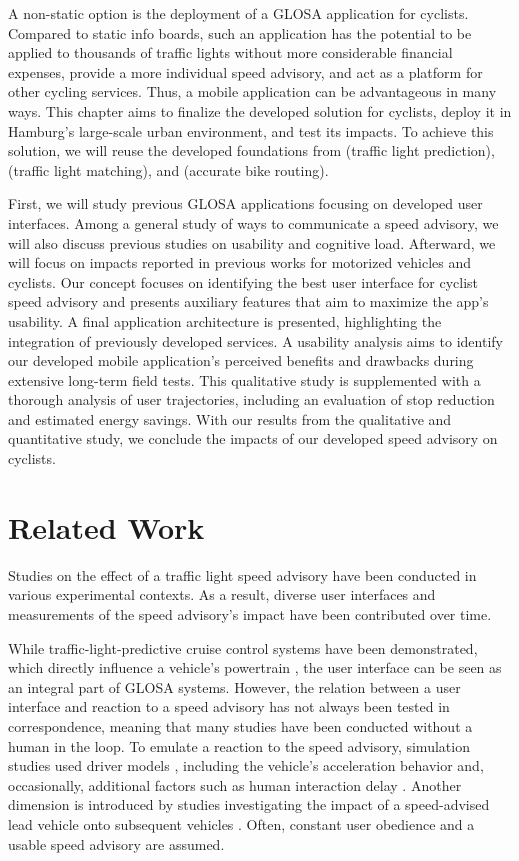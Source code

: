 A non-static option is the deployment of a GLOSA application for cyclists. Compared to static info boards, such an application has the potential to be applied to thousands of traffic lights without more considerable financial expenses, provide a more individual speed advisory, and act as a platform for other cycling services. Thus, a mobile application can be advantageous in many ways. This chapter aims to finalize the developed solution for cyclists, deploy it in Hamburg's large-scale urban environment, and test its impacts. To achieve this solution, we will reuse the developed foundations from  (traffic light prediction),  (traffic light matching), and  (accurate bike routing).

First, we will study previous GLOSA applications focusing on developed user interfaces. Among a general study of ways to communicate a speed advisory, we will also discuss previous studies on usability and cognitive load. Afterward, we will focus on impacts reported in previous works for motorized vehicles and cyclists. Our concept focuses on identifying the best user interface for cyclist speed advisory and presents auxiliary features that aim to maximize the app's usability. A final application architecture is presented, highlighting the integration of previously developed services. A usability analysis aims to identify our developed mobile application's perceived benefits and drawbacks during extensive long-term field tests. This qualitative study is supplemented with a thorough analysis of user trajectories, including an evaluation of stop reduction and estimated energy savings. With our results from the qualitative and quantitative study, we conclude the impacts of our developed speed advisory on cyclists. 

\section{Related Work}

Studies on the effect of a traffic light speed advisory have been conducted in various experimental contexts. As a result, diverse user interfaces and measurements of the speed advisory's impact have been contributed over time. 

While traffic-light-predictive cruise control systems have been demonstrated, which directly influence a vehicle's powertrain \cite{raubitschek_predictive_2011}, the user interface can be seen as an integral part of GLOSA systems. However, the relation between a user interface and reaction to a speed advisory has not always been tested in correspondence, meaning that many studies have been conducted without a human in the loop. To emulate a reaction to the speed advisory, simulation studies used driver models \cite{hu_lane-level_2023}, including the vehicle's acceleration behavior and, occasionally, additional factors such as human interaction delay \cite{schlamp_2023_glosa}. Another dimension is introduced by studies investigating the impact of a speed-advised lead vehicle onto subsequent vehicles \cite{preuk_does_2016, preuk_should_2018}. Often, constant user obedience and a usable speed advisory are assumed.

